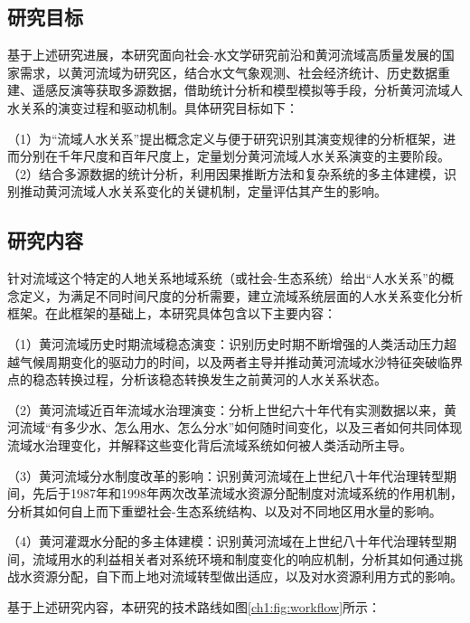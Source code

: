 
\subsection{研究目标}
基于上述研究进展，本研究面向社会-水文学研究前沿和黄河流域高质量发展的国家需求，以黄河流域为研究区，结合水文气象观测、社会经济统计、历史数据重建、遥感反演等获取多源数据，借助统计分析和模型模拟等手段，分析黄河流域人水关系的演变过程和驱动机制。具体研究目标如下：

（1）为“流域人水关系”提出概念定义与便于研究识别其演变规律的分析框架，进而分别在千年尺度和百年尺度上，定量划分黄河流域人水关系演变的主要阶段。
（2）结合多源数据的统计分析，利用因果推断方法和复杂系统的多主体建模，识别推动黄河流域人水关系变化的关键机制，定量评估其产生的影响。


\subsection{研究内容}

针对流域这个特定的人地关系地域系统（或社会-生态系统）给出“人水关系”的概念定义，为满足不同时间尺度的分析需要，建立流域系统层面的人水关系变化分析框架。在此框架的基础上，本研究具体包含以下主要内容：

（1）黄河流域历史时期流域稳态演变：识别历史时期不断增强的人类活动压力超越气候周期变化的驱动力的时间，以及两者主导并推动黄河流域水沙特征突破临界点的稳态转换过程，分析该稳态转换发生之前黄河的人水关系状态。

（2）黄河流域近百年流域水治理演变：分析上世纪六十年代有实测数据以来，黄河流域“有多少水、怎么用水、怎么分水”如何随时间变化，以及三者如何共同体现流域水治理变化，并解释这些变化背后流域系统如何被人类活动所主导。

（3）黄河流域分水制度改革的影响：识别黄河流域在上世纪八十年代治理转型期间，先后于1987年和1998年两次改革流域水资源分配制度对流域系统的作用机制，分析其如何自上而下重塑社会-生态系统结构、以及对不同地区用水量的影响。

（4）黄河灌溉水分配的多主体建模：识别黄河流域在上世纪八十年代治理转型期间，流域用水的利益相关者对系统环境和制度变化的响应机制，分析其如何通过挑战水资源分配，自下而上地对流域转型做出适应，以及对水资源利用方式的影响。

基于上述研究内容，本研究的技术路线如图\ref{ch1:fig:workflow}所示：

